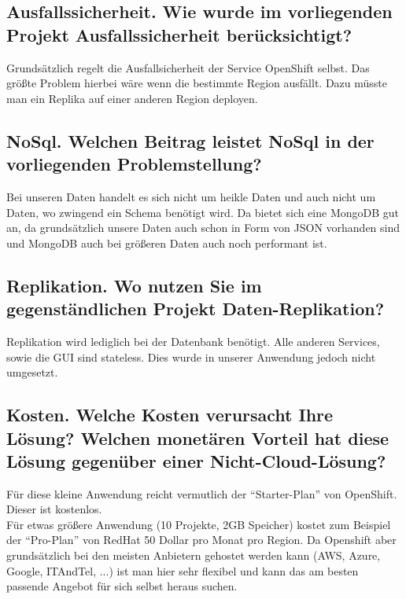 \documentclass[11pt, a4paper]{article}   	%
\begin{document}
\subsection{Ausfallssicherheit.  Wie wurde im vorliegenden Projekt Ausfallssicherheit berücksichtigt?}
Grundsätzlich regelt die Ausfallsicherheit der Service OpenShift selbst. Das größte Problem hierbei wäre wenn die bestimmte Region ausfällt. Dazu müsste man ein Replika auf einer anderen Region deployen.

\subsection{NoSql. Welchen Beitrag leistet NoSql in der vorliegenden Problemstellung?}
Bei unseren Daten handelt es sich nicht um heikle Daten und auch nicht um Daten, wo zwingend ein Schema benötigt wird. Da bietet sich eine MongoDB gut an, da grundsätzlich unsere Daten auch schon in Form von JSON vorhanden sind und MongoDB auch bei größeren Daten auch noch performant ist. 

\subsection{Replikation. Wo nutzen Sie im gegenständlichen Projekt Daten-Replikation?}
Replikation wird lediglich bei der Datenbank benötigt. Alle anderen Services, sowie die GUI sind stateless. Dies wurde in unserer Anwendung jedoch nicht umgesetzt.

\subsection{Kosten. Welche Kosten verursacht Ihre Lösung? Welchen monetären Vorteil hat diese Lösung gegenüber einer Nicht-Cloud-Lösung?}

Für diese kleine Anwendung reicht vermutlich der \enquote{Starter-Plan} von OpenShift. Dieser ist kostenlos. \\
Für etwas größere Anwendung (10 Projekte, 2GB Speicher) kostet zum Beispiel der \enquote{Pro-Plan} von RedHat 50 Dollar pro Monat pro Region. Da Openshift aber grundsätzlich bei den meisten Anbietern gehostet werden kann (AWS, Azure, Google, ITAndTel, ...) ist man hier sehr flexibel und kann das am besten passende Angebot für sich selbst heraus suchen.
\end{document}
